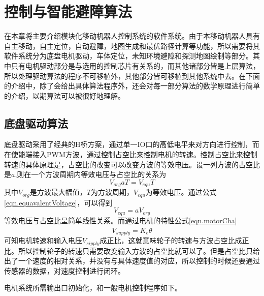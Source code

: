

\chapter{控制与智能避障算法}
\label{chap:algorithm}

在本章将主要介绍模块化移动机器人控制系统的软件系统。由于本移动机器人具有自主移动，自主定位，自动避障，地图生成和最优路径计算等功能，所以需要将其软件系统分为底盘电机驱动，车体定位，未知环境避障和探测地图绘制等部分。其中只有电机驱动部分是与选用的控制芯片有关系的，而其他诸部分皆是上层算法，所以处理驱动算法的程序不可移植外，其他部分皆可移植到其他系统中去。在下面的介绍中，除了会给出具体算法程序外，还会对每一部分算法的数学原理进行简单的介绍，以期算法可以被很好地理解。

\section{底盘驱动算法}
底盘驱动采用了经典的H桥方案，通过单一IO口的高低电平来对方向进行控制，而在使能端接入PWM方波，通过控制占空比来控制电机的转速。控制占空比来控制转速的具体原理是，占空比的改变可以改变方波的等效电压。设一列方波的占空比是$a$,则在一个方波周期内等效电压与占空比的关系为 \\
\begin{equation}\label{eqn.equavalentVoltage}
V_{org}aT=V_{equ}T
\end{equation}
其中$V_{org}$是方波最大幅值，$T$为方波周期，$V_{equ}$为等效电压。通过公式\eqref{eqn.equavalentVoltage}，可以得到\\
\begin{equation}
V_{equ} = aV_{org}
\end{equation}
等效电压与占空比呈简单线性关系。而通过电机的特性公式\eqref{eqn.motorCha} \\
\begin{equation}\label{eqn.motorCha}
V_{supply} = K_{e}\dot{\theta}
\end{equation}
可知电机转速和输入电压$V_{sipply}$成正比，这就意味轮子的转速与方波占空比成正比。所以控制轮子的转速只需要改变输入方波的占空比就可以了。但是占空比只给出了一个速度的相对关系，并没有与具体速度值的对应，所以控制的时候还要通过传感器的数据，对速度控制进行闭环。

电机系统所需输出口初始化，和一般电机控制程序如下。

